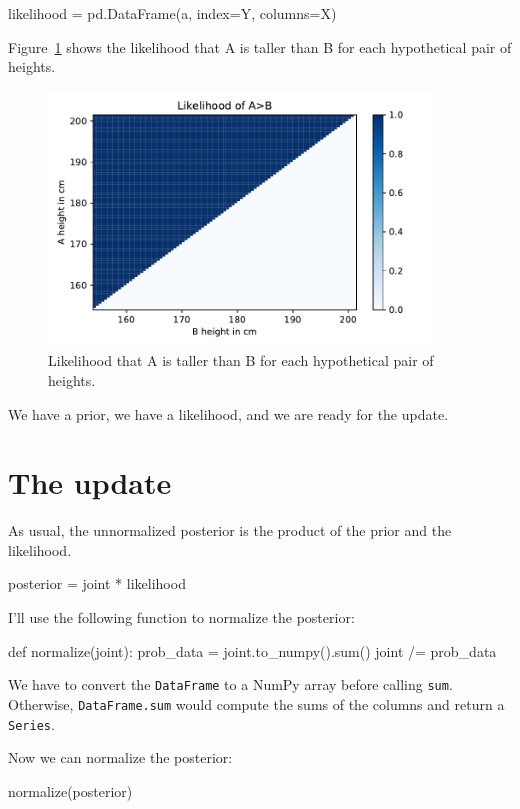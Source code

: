 \documentclass[12pt]{book}
\theoremstyle{exercise}
\newcommand{\py}[1]{{\tt #1}}%
\begin{document}
\begin{code}
likelihood = pd.DataFrame(a, index=Y, columns=X)
\end{code}

Figure~\ref{fig09-02} shows the likelihood that A is taller than B for each hypothetical pair of heights.

\begin{figure}
\centerline{\includegraphics[width=4in]{figs/fig09-02.pdf}}
\caption{Likelihood that A is taller than B for each hypothetical pair of heights.}
\label{fig09-02}
\end{figure}

We have a prior, we have a likelihood, and we are ready for the update.

\section{The update}

As usual, the unnormalized posterior is the product of the prior and the likelihood.

\begin{code}
posterior = joint * likelihood
\end{code}

I'll use the following function to normalize the posterior:

\begin{code}
def normalize(joint):
    prob_data = joint.to_numpy().sum()
    joint /= prob_data
\end{code}

We have to convert the \py{DataFrame} to a NumPy array before calling \py{sum}.  Otherwise, \py{DataFrame.sum} would compute the sums of the columns and return a \py{Series}.

Now we can normalize the posterior:

\begin{code}
normalize(posterior)
\end{code}
\end{document}
